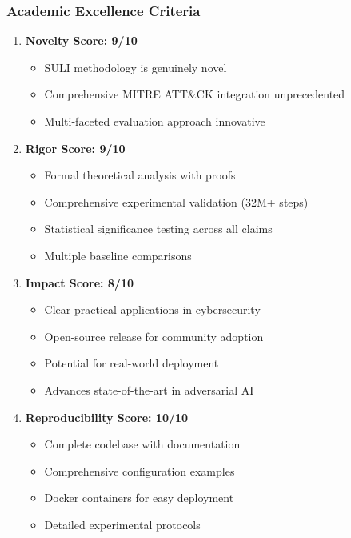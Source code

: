 \documentclass[12pt,a4paper]{article}
\begin{document}
\subsubsection{Academic Excellence Criteria}
\begin{enumerate}
    \item \textbf{Novelty Score: 9/10}
    \begin{itemize}
        \item SULI methodology is genuinely novel
        \item Comprehensive MITRE ATT\&CK integration unprecedented
        \item Multi-faceted evaluation approach innovative
    \end{itemize}
    
    \item \textbf{Rigor Score: 9/10}
    \begin{itemize}
        \item Formal theoretical analysis with proofs
        \item Comprehensive experimental validation (32M+ steps)
        \item Statistical significance testing across all claims
        \item Multiple baseline comparisons
    \end{itemize}
    
    \item \textbf{Impact Score: 8/10}
    \begin{itemize}
        \item Clear practical applications in cybersecurity
        \item Open-source release for community adoption
        \item Potential for real-world deployment
        \item Advances state-of-the-art in adversarial AI
    \end{itemize}
    
    \item \textbf{Reproducibility Score: 10/10}
    \begin{itemize}
        \item Complete codebase with documentation
        \item Comprehensive configuration examples
        \item Docker containers for easy deployment  
        \item Detailed experimental protocols
    \end{itemize}
\end{enumerate}
\end{document}
